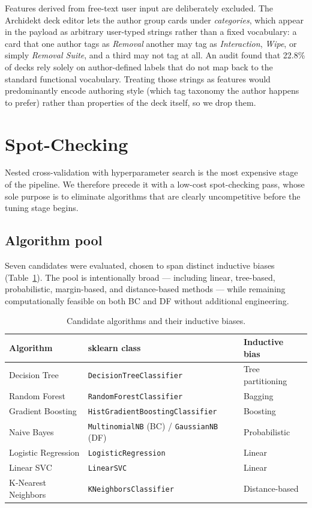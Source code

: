 \documentclass{article}
\begin{document}
Features derived from free-text user input are deliberately excluded. The Archidekt deck editor lets the author group cards under \textit{categories}, which appear in the payload as arbitrary user-typed strings rather than a fixed vocabulary: a card that one author tags as \textit{Removal} another may tag as \textit{Interaction}, \textit{Wipe}, or simply \textit{Removal Suite}, and a third may not tag at all. An audit found that 22.8\% of decks rely solely on author-defined labels that do not map back to the standard functional vocabulary. Treating those strings as features would predominantly encode authoring style (which tag taxonomy the author happens to prefer) rather than properties of the deck itself, so we drop them.
\section{Spot-Checking}
\label{sec:spotcheck}

Nested cross-validation with hyperparameter search is the most expensive stage of the pipeline. We therefore precede it with a low-cost spot-checking pass, whose sole purpose is to eliminate algorithms that are clearly uncompetitive before the tuning stage begins.

\subsection{Algorithm pool}
\label{sec:spotcheck:pool}
Seven candidates were evaluated, chosen to span distinct inductive biases (Table~\ref{tab:algorithms}). The pool is intentionally broad --- including linear, tree-based, probabilistic, margin-based, and distance-based methods --- while remaining computationally feasible on both BC and DF without additional engineering.

\begin{table}[h]
\centering
\caption{Candidate algorithms and their inductive biases.}
\label{tab:algorithms}
\begin{tabular}{lll}
\toprule
Algorithm & sklearn class & Inductive bias \\
\midrule
Decision Tree       & \texttt{DecisionTreeClassifier}        & Tree partitioning \\
Random Forest       & \texttt{RandomForestClassifier}        & Bagging \\
Gradient Boosting   & \texttt{HistGradientBoostingClassifier} & Boosting \\
Naive Bayes         & \texttt{MultinomialNB} (BC) / \texttt{GaussianNB} (DF) & Probabilistic \\
Logistic Regression & \texttt{LogisticRegression}           & Linear \\
Linear SVC          & \texttt{LinearSVC}                     & Linear \\
K-Nearest Neighbors & \texttt{KNeighborsClassifier}         & Distance-based \\
\bottomrule
\end{tabular}
\end{table}
\end{document}
